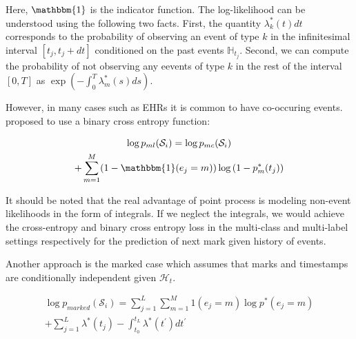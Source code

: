 \documentclass[journal,twoside,web]{ieeecolor}
\begin{document}
Here, $\mathbbm{1}$ is the indicator function. The log-likelihood can be understood using the following two facts. First, the quantity $\lambda_k^{*}(t)dt$ corresponds to the probability of observing an event of type $k$ in the infinitesimal interval $[t_j,t_j+dt]$ conditioned on the past events $\mathbb{H}_{t_j}$. Second, we can compute the probability of not observing any eevents of type $k$ in the rest of the interval $[0,T]$ as $\exp \left(-\int_{0}^{T}  \lambda_m^{*}(s) ds\right)$.

However, in many cases such as EHRs it is common to have co-occuring events. \cite*{enguehardNeuralTemporalPoint2020} proposed to use a binary cross entropy function:


\begin{multline} \label{eq:CIF-ml}
    \log p_{ml}(\mathcal{S}_{i}) = \log p_{mc}(\mathcal{S}_{i}) \\
    + \sum_{m = 1}^{M} (1-\mathbbm{1}(e_j=m)) \log \left(1-p_m^{*}(t_j)  \right)
\end{multline} 



It should be noted that the real advantage of point process is modeling non-event likelihoods in the form of integrals. If we neglect the integrals, we would achieve the cross-entropy and binary cross entropy loss in the multi-class and multi-label settings respectively for the prediction of next mark given history of events.

Another approach is the marked case which assumes that marks and timestamps are conditionally independent given $\mathcal{H}_t$.

\begin{multline} \label{eq:CIF-marked}
    \log p_{marked}(\mathcal{S}_{i}) =    
    \sum_{j = 1}^{L}\sum_{m = 1}^{M} 1(e_j=m)   \log p^{*}(e_j=m) \\
    +\sum_{j = 1}^{L}\lambda^{*}(t_j) - \int_{t_0}^{t_{L}}\lambda^{*}(t^{\prime})dt^{\prime}  
\end{multline} 
\end{document}
